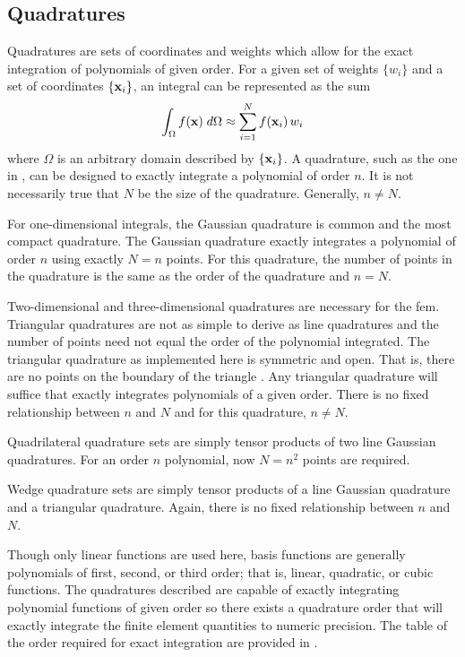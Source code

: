   \subsection{Quadratures}
    \label{sec:quadratures}
    Quadratures are sets of coordinates and weights which allow for the exact 
    integration of polynomials of given order. For a given set of weights 
    $\{w_i\}$ and a set of coordinates $\{\mathbf{x}_i\}$, an integral can be 
    represented as the sum
    \begin{equation}
      \label{eq:quadrature}
      \int_{\Omega} f(\mathbf{x}) \;d\Omega \approx \sum_{i=1}^{N} f(\mathbf{x}_i) \, w_i 
    \end{equation}
    where $\Omega$ is an arbitrary domain described by $\{\mathbf{x}_i\}$. 
    A quadrature, such as the one in , can be designed to 
    exactly integrate a polynomial of order $n$. It is not necessarily true
    that $N$ be the size of the quadrature. Generally, $n \ne N$.
    
    For one-dimensional integrals, the Gaussian quadrature is common and the 
    most compact quadrature. The Gaussian quadrature exactly integrates a 
    polynomial of order $n$ using exactly $N=n$ points. For this quadrature, the
    number of points in the quadrature is the same as the order of the
    quadrature and $n=N$.
    
    Two-dimensional and three-dimensional quadratures are necessary for the 
    \gls{fem}. Triangular quadratures are not as simple to derive
    as line quadratures and the number of points need not equal the order of the
    polynomial integrated. The triangular quadrature as implemented here is 
    symmetric and open. That is, there are no points on the boundary of the 
    triangle \cite{triangleQuadrature}. Any triangular quadrature will suffice
    that exactly integrates polynomials of a given order. There is no fixed
    relationship between $n$ and $N$ and for this quadrature, $n \ne N$.
    
    Quadrilateral quadrature sets are simply tensor products of two line 
    Gaussian quadratures. For an order $n$ polynomial, now $N=n^2$ points are 
    required. 
    
    Wedge quadrature sets are simply tensor products of a line Gaussian 
    quadrature and a triangular quadrature. Again, there is no fixed
    relationship between $n$ and $N$.
    
    Though only linear functions are used here, basis functions are generally
    polynomials of first, second, or third order; that is, linear, quadratic, or
    cubic functions. The quadratures described are capable of exactly
    integrating polynomial functions of given order so there exists a quadrature
    order that will exactly integrate the finite element quantities to numeric
    precision. The table of the order required for exact integration are
    provided in .


